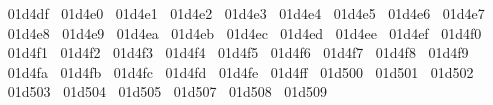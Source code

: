 {  ^^^^^^01d4df%
  ^^^^^^01d4e0%
  ^^^^^^01d4e1%
  ^^^^^^01d4e2%
  ^^^^^^01d4e3%
  ^^^^^^01d4e4%
  ^^^^^^01d4e5%
  ^^^^^^01d4e6%
  ^^^^^^01d4e7%
  ^^^^^^01d4e8%
  ^^^^^^01d4e9%
  ^^^^^^01d4ea%
  ^^^^^^01d4eb%
  ^^^^^^01d4ec%
  ^^^^^^01d4ed%
  ^^^^^^01d4ee%
  ^^^^^^01d4ef%
  ^^^^^^01d4f0%
  ^^^^^^01d4f1%
  ^^^^^^01d4f2%
  ^^^^^^01d4f3%
  ^^^^^^01d4f4%
  ^^^^^^01d4f5%
  ^^^^^^01d4f6%
  ^^^^^^01d4f7%
  ^^^^^^01d4f8%
  ^^^^^^01d4f9%
  ^^^^^^01d4fa%
  ^^^^^^01d4fb%
  ^^^^^^01d4fc%
  ^^^^^^01d4fd%
  ^^^^^^01d4fe%
  ^^^^^^01d4ff%
  ^^^^^^01d500%
  ^^^^^^01d501%
  ^^^^^^01d502%
  ^^^^^^01d503%
  ^^^^^^01d504%
  ^^^^^^01d505%
  ^^^^^^01d507%
  ^^^^^^01d508%
  ^^^^^^01d509%
}
